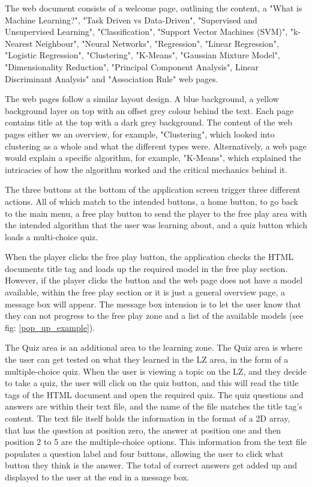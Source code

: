 	The web document consists of a welcome page, outlining the content, a "What is Machine Learning?", "Task Driven vs Data-Driven", "Supervised and Unsupervised Learning", "Classification", "Support Vector Machines (SVM)", "k-Nearest Neighbour", "Neural Networks", "Regression", "Linear Regression", "Logistic Regression", "Clustering", "K-Means", "Gaussian Mixture Model", "Dimensionality Reduction", "Principal Component Analysis", Linear Discriminant Analysis" and "Association Rule" web pages.
	
	The web pages follow a similar layout design. A blue background, a yellow background layer on top with an offset grey colour behind the text. Each page contains title at the top with a dark grey background. The content of the web pages either we an overview, for example, "Clustering", which looked into clustering as a whole and what the different types were. Alternatively, a web page would explain a specific algorithm, for example, "K-Means", which explained the intricacies of how the algorithm worked and the critical mechanics behind it.
	
	The three buttons at the bottom of the application screen trigger three different actions. All of which match to the intended buttons, a home button, to go back to the main menu, a free play button to send the player to the free play area with the intended algorithm that the user was learning about, and a quiz button which loads a multi-choice quiz.
	
	When the player clicks the free play button, the application checks the HTML documents title tag and loads up the required model in the free play section. However, if the player clicks the button and the web page does not have a model available, within the free play section or it is just a general overview page, a message box will appear. The message box intension is to let the user know that they can not progress to the free play zone and a list of the available models (see fig: \ref{pop_up_example}).
	
	The Quiz area is an additional area to the learning zone. The Quiz area is where the user can get tested on what they learned in the LZ area, in the form of a multiple-choice quiz. When the user is viewing a topic on the LZ, and they decide to take a quiz, the user will click on the quiz button, and this will read the title tags of the HTML document and open the required quiz. The quiz questions and answers are within their text file, and the name of the file matches the title tag's content. The text file itself holds the information in the format of a 2D array, that has the question at position zero, the answer at position one and then position 2 to 5 are the multiple-choice options. This information from the text file populates a question label and four buttons, allowing the user to click what button they think is the answer. The total of correct answers get added up and displayed to the user at the end in a message box.
	

